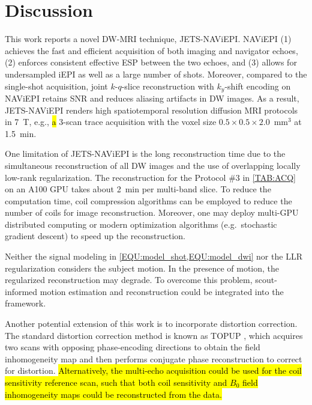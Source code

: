 \documentclass[preprint,12pt,authoryear,review]{elsarticle}
\begin{document}
    \clearpage

    \section{Discussion}
    \label{SEC:Disc}

    This work reports a novel DW-MRI technique, JETS-NAViEPI.
    NAViEPI (1) achieves the fast and efficient acquisition of
    both imaging and navigator echoes,
    (2) enforces consistent effective ESP between the two echoes, and
    (3) allows for undersampled iEPI as well as a large number of shots.
    Moreover, compared to the single-shot acquisition,
    joint $k$-$q$-slice reconstruction
    with $k_y$-shift encoding on NAViEPI
    retains SNR and reduces aliasing artifacts in DW images.
    As a result, JETS-NAViEPI renders high spatiotemporal resolution
    diffusion MRI protocols in \SI{7}{\tesla},
    e.g., \hl{a} 3-scan trace acquisition with the voxel size
    $0.5\times0.5\times2.0$~mm$^3$ at \SI{1.5}{\minute}.

    One limitation of JETS-NAViEPI is the long reconstruction time
    due to the simultaneous reconstruction of all DW images and
    the use of overlapping locally low-rank regularization.
    The reconstruction for the Protocol \#3 in \cref{TAB:ACQ}
    on an A100 GPU takes about \SI{2}{\minute} per multi-band slice.
    To reduce the computation time, coil compression algorithms
    \citep{buehrer_2007_scc,huang_2008_scc}
    can be employed to reduce the number of coils for image reconstruction.
    Moreover, one may deploy multi-GPU distributed computing
    or modern optimization algorithms
    (e.g.~stochastic gradient descent) \citep{ong_2020_extreme}
    to speed up the reconstruction.

    Neither the signal modeling in
    \cref{EQU:model_shot,EQU:model_dwi}
    nor the LLR regularization considers the subject motion.
    In the presence of motion, the regularized reconstruction may degrade.
    To overcome this problem, scout-informed motion estimation
    and reconstruction \citep{polak_2022_samer}
    could be integrated into the framework.

    Another potential extension of this work is
    to incorporate distortion correction.
    The standard distortion correction method is
    known as TOPUP \citep{andersson_2003_topup},
    which acquires two scans
    with opposing phase-encoding directions to
    obtain the field inhomogeneity map and
    then performs conjugate phase reconstruction
    to correct for distortion.
    \hl{Alternatively, the multi-echo acquisition could be used
    for the coil sensitivity reference scan, such that
    both coil sensitivity and $B_0$ field inhomogeneity maps
    could be reconstructed from the data.}
\end{document}

